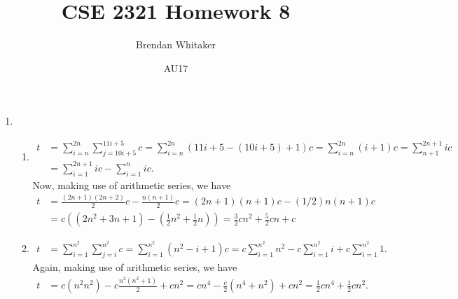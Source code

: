 \documentclass[10pt,oneside,reqno]{amsart}
\theoremstyle{plain}
\theoremstyle{definition}
\begin{document}
\title{CSE 2321 Homework 8}

\date{AU17}

\author[Brendan Whitaker]{Brendan Whitaker}

\maketitle

\begin{enumerate}[label=]

\item 

\begin{enumerate}

\item 

\begin{equation}
\begin{aligned}
t &= \sum_{i = n}^{2n}\sum_{j = 10i + 5}^{11i + 5}c = \sum_{i = n}^{2n} (11i + 5 - (10i + 5) + 1)c = \sum_{i = n}^{2n} (i + 1)c = \sum_{n + 1}^{2n + 1} ic \\
&= \sum_{i  =1}^{2n  +1}ic - \sum_{i = 1}^n ic.
\end{aligned}
\end{equation}
Now, making use of arithmetic series, we have
\begin{equation}
\begin{aligned}
t &= \frac{(2n + 1)(2n + 2)}{2}c - \frac{n(n  +1)}{2}c = (2n + 1)(n + 1)c - (1/2)n(n+ 1)c \\
&= c((2n^2 + 3n + 1) - (\frac{1}{2}n^2 + \frac{1}{2}n)) = \boxed{\frac{3}{2}cn^2} + \frac{5}{2}cn + c
\end{aligned}
\end{equation}

\item 

\begin{equation}
\begin{aligned}
t &= \sum_{i = 1}^{n^2}\sum_{j = i}^{n^2}c = \sum_{i = 1}^{n^2}(n^2 - i + 1)c = c\sum_{i = 1}^{n^2}n^2 - c\sum_{i = 1}^{n^2}i + c\sum_{i = 1}^{n^2}1.
\end{aligned}
\end{equation}
Again, making use of arithmetic series, we have
\begin{equation}
\begin{aligned}
t &= c(n^2n^2) - c\frac{n^2(n^2 + 1)}{2} + cn^2 = cn^4 - \frac{c}{2}(n^4 + n^2) + cn^2 = \boxed{\frac{1}{2}cn^4} + \frac{1}{2}cn^2.
\end{aligned}
\end{equation}


\end{enumerate}
\end{enumerate}
\end{document}
